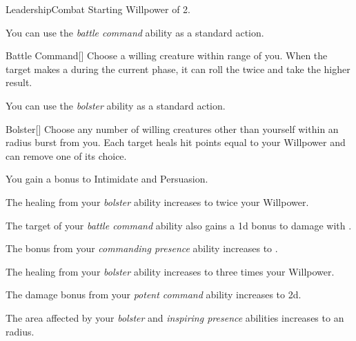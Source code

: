     \begin{feat}{Leadership}{Combat}
        \featpre Starting Willpower of 2.

         You can use the \textit{battle command} ability as a standard action.
        \begin{freeability}{Battle Command}[]
            Choose a willing creature within \rngmed range of you.
            When the target makes a  during the current phase, it can roll the  twice and take the higher result.
        \end{freeability}

         You can use the \textit{bolster} ability as a standard action.
        \begin{apability}{Bolster}[]
            Choose any number of willing creatures other than yourself within an \areamed radius burst from you.
            Each target heals hit points equal to your Willpower and can remove one  of its choice.
        \end{apability}

         You gain a  bonus to Intimidate and Persuasion.

         The healing from your \textit{bolster} ability increases to twice your Willpower.

         The target of your \textit{battle command} ability also gains a \plus1d bonus to damage with .

         The bonus from your \textit{commanding presence} ability increases to .

         The healing from your \textit{bolster} ability increases to three times your Willpower.

         The damage bonus from your \textit{potent command} ability increases to \plus2d.

         The area affected by your \textit{bolster} and \textit{inspiring presence} abilities increases to an \areahuge radius.
    \end{feat}

